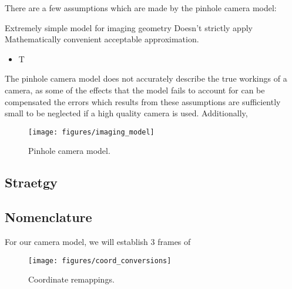 There are a few assumptions which are made by the pinhole camera model:

Extremely simple model for imaging geometry
Doesn't strictly apply
Mathematically convenient acceptable approximation.
\begin{itemize}
    \item T
\end{itemize}

The pinhole camera model does not accurately describe the true workings of a camera, as some of the  effects that the model fails to account for can be compensated the errors which results from these assumptions are sufficiently small to be neglected if a high quality camera is used. Additionally,

\begin{figure}[h!]
    \centering
    \texttt{[image: figures/imaging\_model]}
    \caption{Pinhole camera model.}
\end{figure}

\subsection{Straetgy}

\subsection{Nomenclature}


For our camera model, we will establish 3 frames of


\begin{figure}[h!]
    \centering
    \texttt{[image: figures/coord\_conversions]}
    \caption{Coordinate remappings.}
\end{figure}



